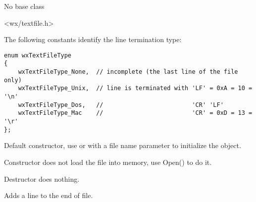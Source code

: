 
No base class


<wx/textfile.h>




The following constants identify the line termination type:

\begin{verbatim}
enum wxTextFileType
{
    wxTextFileType_None,  // incomplete (the last line of the file only)
    wxTextFileType_Unix,  // line is terminated with 'LF' = 0xA = 10 = '\n'
    wxTextFileType_Dos,   //                         'CR' 'LF'
    wxTextFileType_Mac    //                         'CR' = 0xD = 13 = '\r'
};
\end{verbatim}




\label{wxtextfilectordef}


Default constructor, use  or 
 with a file name parameter to initialize the object.

\label{wxtextfilector}


Constructor does not load the file into memory, use Open() to do it. 

\label{wxtextfiledtor}


Destructor does nothing.

\label{wxtextfileaddline}


Adds a line to the end of file.

\label{wxtextfileclose}


